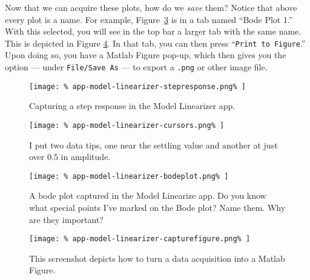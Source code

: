 Now that we can acquire these plots, how do we \emph{save} them? Notice that
above every plot is a name. For example, Figure~\ref{fig:app1:bodeplot} is
in a tab named ``Bode Plot 1.'' With this selected, you will see in the top
bar a larger tab with the same name. This is depicted in Figure
\ref{fig:app1:capturefigure}. In that tab, you can then press
``\texttt{Print to Figure}.'' Upon doing so, you have a Matlab Figure pop-up,
which then gives you the option --- under \texttt{File/Save As} --- to
export a \texttt{.png} or other image file.
%
\begin{figure}
  \centering
  \texttt{[image: \%
    app-model-linearizer-stepresponse.png\%
  ]}
  \caption[Capturing a Step Response in the Model Linearizer App]{%
    Capturing a step response in the Model Linearizer app.
  }
  \label{fig:app1:stepresponse}
\end{figure}
%
\begin{figure}
  \centering
  \texttt{[image: \%
    app-model-linearizer-cursors.png\%
  ]}
  \caption[Data Tips in Matlab Figures]{%
    I put two data tips, one near the settling value and another at
    just over \(0.5\) in amplitude.
  }
  \label{fig:app1:cursors}
\end{figure}
%
\begin{figure}
  \centering
  \texttt{[image: \%
    app-model-linearizer-bodeplot.png\%
  ]}
  \caption[Bode Plot captured in the Model Linearizer App]{%
    A bode plot captured in the Model Linearize app. Do you know what special
    points I've marked on the Bode plot? Name them. Why are they important?
  }
  \label{fig:app1:bodeplot}
\end{figure}
%
\begin{figure}
  \centering
  \texttt{[image: \%
    app-model-linearizer-capturefigure.png\%
  ]}
  \caption[Acquiring a Figure in the Model Linearizer App]{%
    This screenshot depicts how to turn a data acquisition into a Matlab
    Figure.
  }
  \label{fig:app1:capturefigure}
\end{figure}
%
